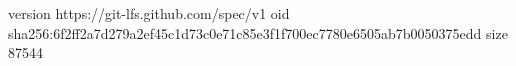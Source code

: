 version https://git-lfs.github.com/spec/v1
oid sha256:6f2ff2a7d279a2ef45c1d73c0e71c85e3f1f700ec7780e6505ab7b0050375edd
size 87544
